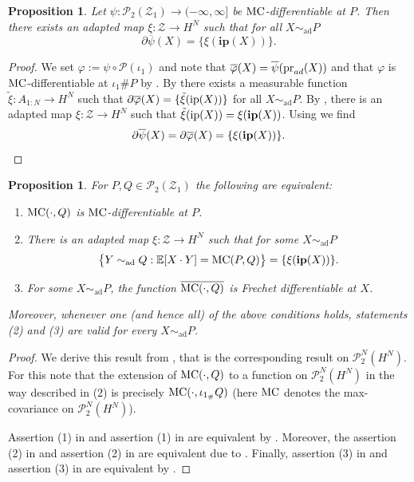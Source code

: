 \documentclass[a4paper]{amsart}
\numberwithin{theorem}{section}
\newtheorem{proposition}[theorem]{Proposition}
\theoremstyle{definition}
\newcommand{\E}{\mathbb{E}}
\newcommand{\pr}{\textup{pr}}
\newcommand{\Pc}{\mathcal P}
\newcommand{\simad}{\sim_{\mathrm{ad}}}
\renewcommand{\H}{H}
\renewcommand{\phi}{\varphi}
\newcommand{\mc}{\textup{MC}}
\newcommand{\MC}{\textup{MC}}
\newcommand{\ip}{\textup{ip}}
\newcommand{\Zc}{\mathcal{Z}}
\newcommand{\ipp}{\mathbf{ip}}
\begin{document}
\begin{proposition}\label{prop:LdiffXi_FP}
Let $\psi:\Pc_2(\Zc_1)\to (-\infty, \infty]$ be $\MC$-differentiable at $P$. Then there exists  an adapted map  $\xi : \Zc \to \H^N$ such that for all $X\simad P$ 
\[
\partial\overline{\psi}(X) = \{\xi( \ipp(X) )\}.
\]
\end{proposition}
\begin{proof}
We set $\phi := \psi \circ \Pc(\iota_1)$ and note that  $\overline{\phi}(X) = \overline{\psi}(\pr_{ad}(X))$ and that $\phi$ is $\mc$-differentiable at $\iota_1\#P$ by . By  there exists a measurable function  $\tilde \xi : A_{1:N} \to \H^N$ such that $ \partial\overline{\phi}(X) = \{\tilde \xi( \ip(X) )\} $ for all $X\simad P$.  By , there is an adapted map $\xi: \Zc \to H^N$ such that $\tilde\xi(\ip(X)) = \xi(\ipp(X))$. Using  we find
\[
\partial\overline{\psi}(X) = \partial\overline{\phi}(X) = \{\xi( \ipp(X) )\}. \qedhere
\]
\end{proof}

\begin{proposition}\label{prop:AJ_FP}
    For $P,Q \in \Pc_2(\Zc_1)$ the following are equivalent:
    \begin{enumerate}
        \item $\mc(\cdot,Q)$ is $\mc$-differentiable at $P$.
        \item There is an adapted map $\xi : \Zc \to \H^N$ such that for some $X \simad P$
        \[
            \big\{ Y \simad Q : \E[X \cdot Y] = \MC(P,Q) \big\} = \{ \xi(\ipp(X)) \}.%
        \]
        \item For some $X \simad P$, the function $\overline{\mc(\cdot,Q)}$ is Frechet differentiable at $X$.
    \end{enumerate}
    Moreover, whenever one (and hence all) of the above conditions holds, statements (2) and (3) are valid for every $X \simad P$.
\end{proposition}
\begin{proof}
We derive this result from , that is the corresponding result on $\Pc^N_2(H^N)$. 
For this note that the extension of $\mc(\cdot ,Q)$ 
to a function on $\Pc_2^N(H^N)$ in the way described in (2) is precisely $\mc(\cdot, \iota_{1_\#}Q)$ (here $\mc$ denotes the max-covariance on $\Pc_2^N(H^N)$). 

Assertion (1)  in  and assertion (1) in  are equivalent by . Moreover, the assertion (2)  in  and assertion (2) in  are equivalent due to . Finally, assertion (3) in  and assertion (3) in  are equivalent by .
\end{proof}
\end{document}
